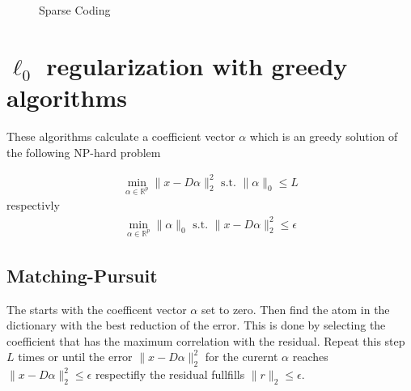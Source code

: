 
\begin{figure}
\centering
\caption{Sparse Coding}
\label{fig:da_x}
\end{figure}




\section{$\ell_0$ regularization with greedy algorithms}
These algorithms calculate a coefficient vector $\alpha$ which is an
greedy solution of the following NP-hard problem

\begin{align}
\min_{\alpha\in\mathbb{R}^{p}}  \lVert x - D\alpha \rVert^{2}_{2} \textrm{ s.t. } \lVert \alpha \rVert_{0} \leq L
\end{align}
respectivly
\begin{align}
\min_{\alpha\in\mathbb{R}^{p}}   \lVert \alpha \rVert_{0}   \textrm{ s.t. } \lVert x - D\alpha \rVert^{2}_{2} \leq \epsilon
\end{align}
\cite{Mallat1993}

\subsection{Matching-Pursuit}
\label{sec:mp}

The  starts with the coefficent vector $\alpha$ set to
zero. Then find the atom in the dictionary with the best reduction of the
error. This is done by selecting the coefficient that has the maximum
correlation with the residual. Repeat this step $L$ times or until the error
$\lVert x - D\alpha \rVert^{2}_{2}$ for the curernt $\alpha$ reaches $\lVert x -
D\alpha \rVert^{2}_{2} \leq \epsilon$ respectifly the residual fullfills $\lVert
r \rVert_2 \leq \epsilon$.



